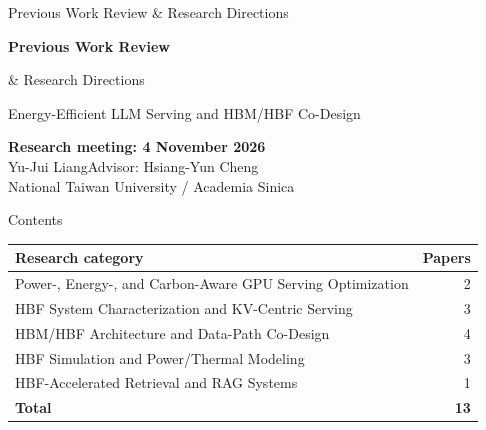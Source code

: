 \documentclass[aspectratio=169,10pt]{beamer}
\begin{document}
\begin{frame}[c]{Previous Work Review \& Research Directions}
\relax
{\LARGE\bfseries Previous Work Review\par\medskip \& Research Directions\par}
\bigskip
{\large\color{Accent}Energy-Efficient LLM Serving and HBM/HBF Co-Design}\par
\bigskip
\textbf{Research meeting: 4 November 2026}\\
Yu-Jui Liang\quad Advisor: Hsiang-Yun Cheng\\
National Taiwan University / Academia Sinica
\end{frame}
\begin{frame}[c]{Contents}
\renewcommand{\arraystretch}{1.6}
\begin{tabularx}{\textwidth}{@{}Xr@{}}
\textbf{\color{Accent}Research category} & \textbf{\color{Accent}Papers} \\
\midrule
Power-, Energy-, and Carbon-Aware GPU Serving Optimization & 2 \\
HBF System Characterization and KV-Centric Serving & 3 \\
HBM/HBF Architecture and Data-Path Co-Design & 4 \\
HBF Simulation and Power/Thermal Modeling & 3 \\
HBF-Accelerated Retrieval and RAG Systems & 1 \\
\midrule
\textbf{Total} & \textbf{13} \\
\end{tabularx}
\end{frame}






\end{document}
